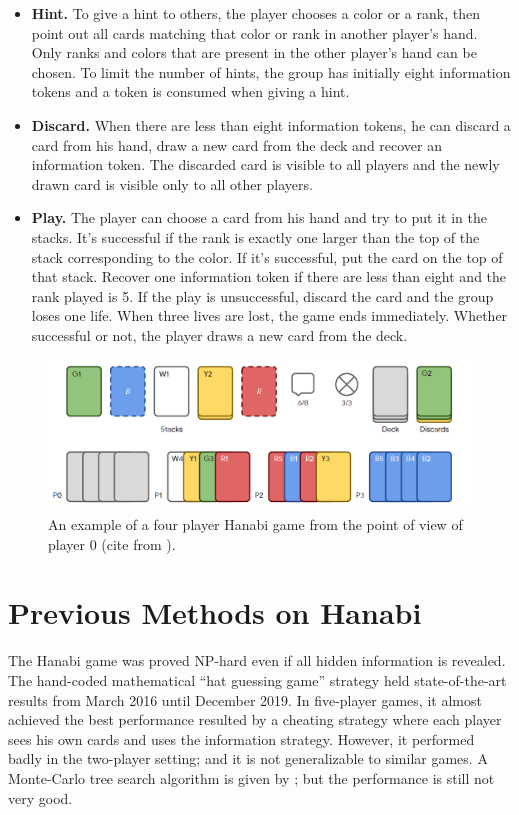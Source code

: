 \documentclass[12pt]{article}
\begin{document}
\begin{spacing}{1.15}
\begin{itemize}
\item \textbf{Hint.} To give a hint to others, the player chooses a color or a rank, then point out all cards matching that color or rank in another player's hand. Only ranks and colors that are present in the other player's hand can be chosen. To limit the number of hints, the group has initially eight information tokens and a token is consumed when giving a hint.
\item \textbf{Discard.} When there are less than eight information tokens, he can discard a card from his hand, draw a new card from the deck and recover an information token. The discarded card is visible to all players and the newly drawn card is visible only to all other players.
\item \textbf{Play.} The player can choose a card from his hand and try to put it in the stacks. It's successful if the rank is exactly one larger than the top of the stack corresponding to the color. If it's successful, put the card on the top of that stack. Recover one information token if there are less than eight and the rank played is 5. If the play is unsuccessful, discard the card and the group loses one life. When three lives are lost, the game ends immediately. Whether successful or not, the player draws a new card from the deck.
\end{itemize}

\begin{figure}[H]
\centerline{\includegraphics[width=6in]{fig1.png}}
\caption{An example of a four player Hanabi game from the point of view of player 0 (cite from \cite{bard2020the}).}
\label{Fig1}
\end{figure}

\section{Previous Methods on Hanabi}

The Hanabi game was proved \textsf{NP}-hard even if all hidden information is revealed.\cite{baffier2017hanabi} The hand-coded mathematical ``hat guessing game'' strategy\cite{cox2015how} held state-of-the-art results from March 2016 until December 2019. In five-player games, it almost achieved the best performance resulted by a cheating strategy where each player sees his own cards and uses the information strategy. However, it performed badly in the two-player setting\cite{bouzy2017playing}; and it is not generalizable to similar games. A Monte-Carlo tree search algorithm is given by \cite{walton-rivers2017evaluating}; but the performance is still not very good.


\end{spacing}
\end{document}
